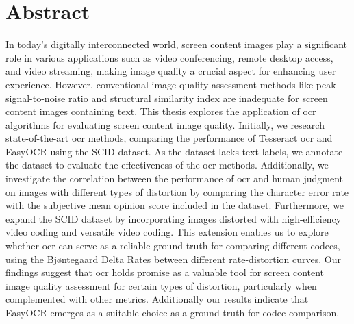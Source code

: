 \chapter{Abstract}

In today's digitally interconnected world, screen content images play a significant role in various applications such as video conferencing, remote desktop access, and video streaming, making image quality a crucial aspect for enhancing user experience.
However, conventional image quality assessment methods like peak signal-to-noise ratio and structural similarity index are inadequate for screen content images containing text.
This thesis explores the application of \gls{ocr} algorithms for evaluating screen content image quality.
Initially, we research state-of-the-art \gls{ocr} methods, comparing the performance of Tesseract \gls{ocr} and EasyOCR using the SCID dataset. 
As the dataset lacks text labels, we annotate the dataset to evaluate the effectiveness of the \gls{ocr} methods.
Additionally, we investigate the correlation between the performance of \gls{ocr} and human judgment on images with different types of distortion by comparing the character error rate with the subjective mean opinion score included in the dataset.
Furthermore, we expand the SCID dataset by incorporating images distorted with high-efficiency video coding and versatile video coding.
This extension enables us to explore whether \gls{ocr} can serve as a reliable ground truth for comparing different codecs, using the Bjøntegaard Delta Rates between different rate-distortion curves.
Our findings suggest that \gls{ocr} holds promise as a valuable tool for screen content image quality assessment for certain types of distortion, particularly when complemented with other metrics.
Additionally our results indicate that EasyOCR emerges as a suitable choice as a ground truth for codec comparison.
